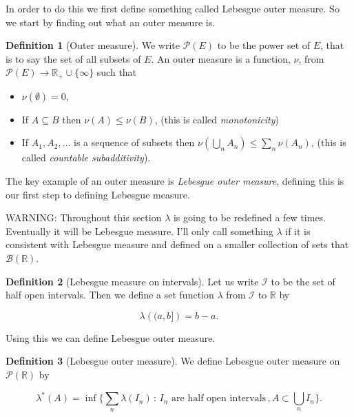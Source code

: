 \documentclass[
]{book}
\providecommand{\tightlist}{%
  \setlength{\itemsep}{0pt}\setlength{\parskip}{0pt}}
\theoremstyle{definition}
\newtheorem{definition}{Definition}[chapter]
\theoremstyle{definition}
\theoremstyle{definition}
\theoremstyle{definition}
\theoremstyle{remark}
\begin{document}
In order to do this we first define something called Lebesgue outer measure. So we start by finding out what an outer measure is.

\begin{definition}[Outer measure]

We write \(\mathscr{P}(E)\) to be the power set of \(E\), that is to say the set of all subsets of \(E\). An outer measure is a function, \(\nu\), from \(\mathscr{P}(E) \rightarrow \mathbb{R}_+ \cup \{\infty\}\) such that

\begin{itemize}
\tightlist
\item
  \(\nu(\emptyset) =0\),
\item
  If \(A \subseteq B\) then \(\nu (A) \leq \nu(B)\), (this is called \emph{monotonicity})
\item
  If \(A_1, A_2, \dots\) is a sequence of subsets then \(\nu\left( \bigcup_n A_n \right) \leq \sum_n \nu(A_n)\), (this is called \emph{countable subadditivity}).
\end{itemize}

\end{definition}

The key example of an outer measure is \emph{Lebesgue outer measure}, defining this is our first step to defining Lebesgue measure.

WARNING: Throughout this section \(\lambda\) is going to be redefined a few times. Eventually it will be Lebesgue measure. I'll only call something \(\lambda\) if it is consistent with Lebesgue measure and defined on a smaller collection of sets that \(\mathcal{B}(\mathbb{R})\).

\begin{definition}[Lebesgue measure on intervals]
Let us write \(\mathcal{I}\) to be the set of half open intervals. Then we define a set function \(\lambda\) from \(\mathcal{I}\) to \(\mathbb{R}\) by

\[ \lambda \left( (a,b] \right) = b-a.\]
\end{definition}

Using this we can define Lebesgue outer measure.

\begin{definition}[Lebesgue outer measure]
We define Lebesgue outer measure on \(\mathscr{P}(\mathbb{R})\) by

\[\lambda^* (A) = \inf \{ \sum_n\lambda (I_n) \, : \, \mbox{$I_n$ are half open intervals}\, , A \subset \bigcup_n I_n\}. \]
\end{definition}
\end{document}
